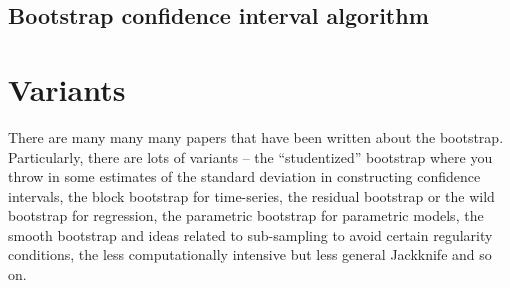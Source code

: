 \documentclass[twoside,12pt]{article}
\begin{document}
\subsection{Bootstrap confidence interval algorithm}

\section{Variants}
There are many many many papers that have been written about the bootstrap. Particularly, there are lots of variants -- the ``studentized'' bootstrap where you throw in some estimates of the standard deviation in constructing confidence intervals, the block bootstrap for time-series, the residual bootstrap or the wild bootstrap for regression, the parametric bootstrap for parametric models, the smooth bootstrap and ideas related to sub-sampling to avoid certain regularity conditions, the less computationally intensive but less general Jackknife and so on. 
\end{document}
